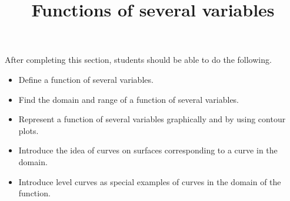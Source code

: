 \documentclass{ximera}
\title{Functions of several variables}
\begin{document}
\begin{abstract}
\end{abstract}

\maketitle

\begin{sectionOutcomes}

After completing this section, students should be able to do the following.

\begin{itemize}
\item Define a function of several variables.
\item Find the domain and range of a function of several variables.
\item Represent a function of several variables graphically and by using contour plots.
\item Introduce the idea of curves on surfaces corresponding to a curve in the domain.
\item Introduce level curves as special examples of curves in the domain of the function.
\end{itemize}

\end{sectionOutcomes}
\end{document}
